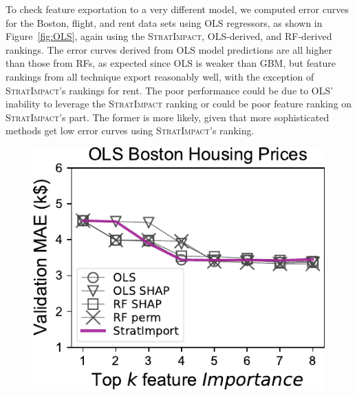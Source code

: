 \documentclass[11pt]{article}
\newcommand{\figref}[1]{Figure~\ref{#1}}
\newcommand{\simp}{\fontfamily{cmr}\textsc{\small StratImpact}}
\begin{document}
To check feature exportation to a very different model, we computed error curves for the Boston, flight, and rent data sets using OLS regressors, as shown in \figref{fig:OLS}, again using the \simp, OLS-derived, and RF-derived rankings.  The error curves derived from OLS model predictions are all higher than those from RFs, as expected since OLS is weaker than GBM, but feature rankings from all technique export reasonably well, with the exception of \simp's rankings for rent.  The poor performance could be due to OLS' inability to leverage the \simp{} ranking or could be poor feature ranking on \simp's part.  The former is more likely, given that more sophisticated methods get low error curves using \simp's ranking.

\begin{figure}[htbp]
\begin{center}
\includegraphics[scale=0.5]{images/boston-topk-OLS-Importance.pdf}~~~

\end{center}
\end{figure}
\end{document}
